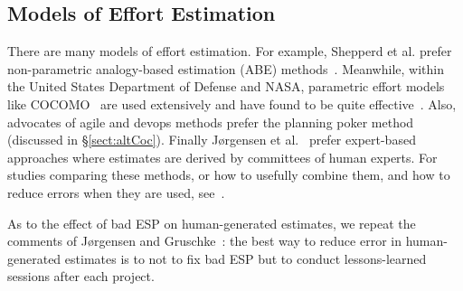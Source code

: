 \documentclass[final,twocolumn]{elsarticle}
\newcommand{\etal}{et al.}
\newcommand{\tion}[1]{\S\ref{sect:#1}}
\theoremstyle{break}
\begin{document}

  \subsection{Models of Effort Estimation}\label{sect:emodels}
  There are many models of effort estimation.
   For example, Shepperd et
 al. prefer non-parametric analogy-based estimation (ABE)
 methods~\cite{shepperd1997estimating}.  Meanwhile, within the
 United States Department of Defense and NASA,
 parametric effort models like
 COCOMO~\cite{boehm81} are used extensively and
 have found to be quite effective~\cite{lum02}.
 Also, advocates of agile and devops methods prefer
 the planning poker method (discussed in \tion{altCoc}).
 Finally J{\o}rgensen  et al.~\cite{jorgensen09} prefer
 expert-based approaches where estimates are derived
 by committees of human experts.  For studies
 comparing these methods, or how to usefully combine
 them, and how to reduce errors when they are used,
 see~\cite{koc11b,Minku2013,garg15,me13a}.

 

 
As to the effect of bad ESP on human-generated estimates, we repeat the comments of
J{\o}rgensen and Gruschke~\cite{jorgensen09}: the best way to reduce error
in human-generated estimates is to not to fix bad ESP but to
conduct lessons-learned sessions after each project. 
 
\end{document}
